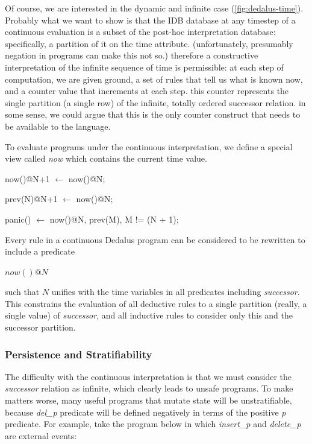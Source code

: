 Of course, we are interested in the dynamic and infinite case (\ref{fig:dedalus-time}).
Probably what we want to show is that the IDB database at any timestep of a continuous evaluation is a subset
of the post-hoc interpretation database: specifically, a partition of it on the time attribute.  (unfortunately, presumably
negation in programs can make this not so.)  therefore a constructive interpretation of the infinite sequence of time is permissible:
at each step of computation, we are given ground, a set of rules that tell us what is known now, and a counter value that increments
at each step.  this counter represents the single partition (a single row) of the infinite, totally ordered successor relation.
in some sense, we could argue that this is the only counter construct that needs to be available to the language.

To evaluate programs under the continuous interpretation, we define a special view called \emph{now} which contains the current 
time value.

\begin{Dedalus}
now()@N+1  \(\leftarrow\)
    now()@N;

prev(N)@N+1  \(\leftarrow\)
    now()@N;

panic()  \(\leftarrow\)
    now()@N,
    prev(M),
    M != (N + 1);
\end{Dedalus}

Every rule in a continuous Dedalus program can be considered to be rewritten to include a predicate

$now()@N$

such that $N$ unifies with the time variables in all predicates including \emph{successor}.  This constrains the evaluation of all deductive 
rules to a single partition (really, a single value) of \emph{successor}, and all inductive rules to consider only this and the successor partition.

\subsubsection{Persistence and Stratifiability}


The difficulty with the continuous interpretation is that we must consider the \emph{successor} relation as infinite, which clearly leads
to unsafe programs.  To make matters worse, many useful programs that mutate state will be unstratifiable, because \emph{del\_p} predicate
will be defined negatively in terms of the positive \emph{p} predicate.  For example, take the program below in which \emph{insert\_p}
and \emph{delete\_p} are external events:

